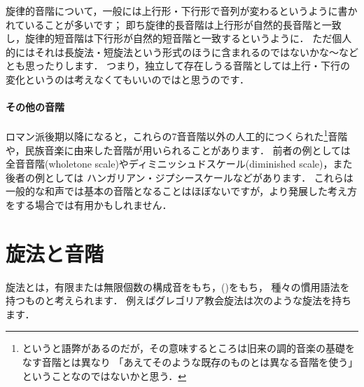 \documentclass[dvipdfmx,uplatex,b5paper,openany,jbase=12Q,nomag*,textwidth-limit=44%
               ]{gachimuchi}[2020/05/05]
\begin{document}
\begin{Yodan}
旋律的音階について，一般には上行形・下行形で音列が変わるというように書かれていることが多いです；
即ち旋律的長音階は上行形が自然的長音階と一致し，旋律的短音階は下行形が自然的短音階と一致するというように．
ただ個人的にはそれは長旋法・短旋法という形式のほうに含まれるのではないかな～などとも思ったりします．
つまり，独立して存在しうる音階としては上行・下行の変化というのは考えなくてもいいのではと思うのです．
\end{Yodan}

\paragraph{その他の音階}
ロマン派後期以降になると，これらの7音音階以外の人工的につくられた\footnote{%
  というと語弊があるのだが，その意味するところは旧来の調的音楽の基礎をなす音階とは異なり
  「あえてそのような既存のものとは異なる音階を使う」ということなのではないかと思う．
}音階や，民族音楽に由来した音階が用いられることがあります．
前者の例としては全音音階(wholetone scale)やディミニッシュドスケール(diminished scale)，また後者の例としては
ハンガリアン・ジプシースケールなどがあります．
これらは一般的な和声では基本の音階となることはほぼないですが，より発展した考え方をする場合では有用かもしれません．

\begin{Music}[0.95\linewidth]
  \nostartrule%
  \Startpiece%
  \Notes{}%
  \en\doublebar%
  \Notes{}%
  \en\doublebar%
  \Notes{}%
  \en\setdoublebar%
  \endpiece%
\end{Music}


\section{旋法と音階}
旋法とは，有限または無限個数の構成音をもち，\xkanjispace()をもち，
種々の慣用語法を持つものと考えられます．
例えばグレゴリア教会旋法は次のような旋法を持ちます．
\end{document}
